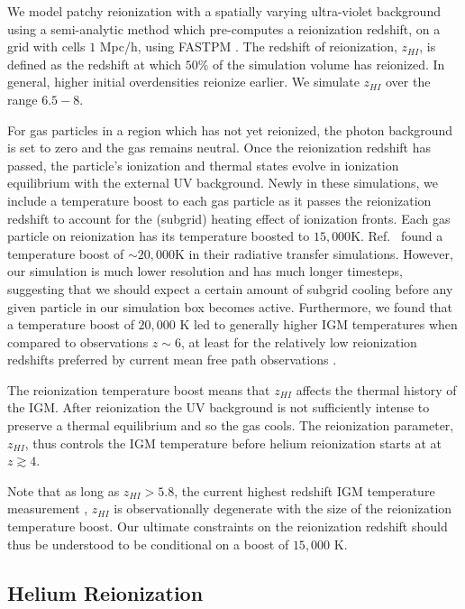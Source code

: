 \documentclass[a4paper,11pt]{article}
\begin{document}
We model patchy reionization with a spatially varying ultra-violet background using a semi-analytic method \cite{Battaglia:2013} which pre-computes a reionization redshift, on a grid with cells $1$ Mpc/h, using FASTPM \cite{FASTPM}. The redshift of reionization, $z_{HI}$, is defined as the redshift at which $50\%$ of the simulation volume has reionized. In general, higher initial overdensities reionize earlier. We simulate $z_{HI}$ over the range $6.5 - 8$.

For gas particles in a region which has not yet reionized, the photon background is set to zero and the gas remains neutral. Once the reionization redshift has passed, the particle's ionization and thermal states evolve in ionization equilibrium with the external UV background. Newly in these simulations, we include a temperature boost to each gas particle as it passes the reionization redshift to account for the (subgrid) heating effect of ionization fronts.
Each gas particle on reionization has its temperature boosted to $15,000$K.
Ref.~\citep{DAloisio:2019} found a temperature boost of $\sim 20,000$K in their radiative transfer simulations. However, our simulation is much lower resolution and has much longer timesteps, suggesting that we should expect a certain amount of subgrid cooling before any given particle in our simulation box becomes active. Furthermore, we found that a temperature boost of $20,000$ K led to generally higher IGM temperatures when compared to observations $z\sim 6$, at least for the relatively low reionization redshifts preferred by current mean free path observations \cite{Cain:2021}.

The reionization temperature boost means that $z_{HI}$ affects the thermal history of the IGM. After reionization the UV background is not sufficiently intense to preserve a thermal equilibrium and so the gas cools. The reionization parameter, $z_{HI}$, thus controls the IGM temperature before helium reionization starts at at $z \gtrsim 4$.

Note that as long as $z_{HI} > 5.8$, the current highest redshift IGM temperature measurement \cite{Gaikwad:2020}, $z_{HI}$ is observationally degenerate with the size of the reionization temperature boost. Our ultimate constraints on the reionization redshift should thus be understood to be conditional on a boost of $15,000$ K.


\subsection{Helium Reionization}
\label{sec:helium}
\end{document}

